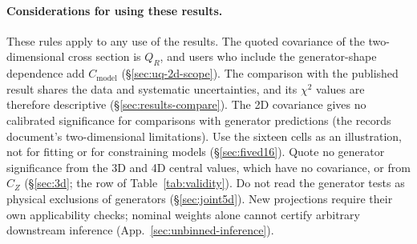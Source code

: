 \paragraph{Considerations for using these results.}\label{sec:usage}\label{sec:limitations-use} These rules apply to any use of the results. The quoted covariance of the two-dimensional cross section is $Q_R$, and users who include the generator-shape dependence add $C_{\mathrm{model}}$ (\S\ref{sec:uq-2d-scope}). The comparison with the published result shares the data and systematic uncertainties, and its $\chi^{2}$ values are therefore descriptive (\S\ref{sec:results-compare}). The 2D covariance gives no calibrated significance for comparisons with generator predictions (the records document's two-dimensional limitations). Use the sixteen cells as an illustration, not for fitting or for constraining models (\S\ref{sec:fived16}). Quote no generator significance from the 3D and 4D central values, which have no covariance, or from $C_Z$ (\S\ref{sec:3d}; the \resFiveAxis{} row of Table~\ref{tab:validity}). Do not read the generator tests as physical exclusions of generators (\S\ref{sec:joint5d}). New projections require their own applicability checks; nominal weights alone cannot certify arbitrary downstream inference (App.~\ref{sec:unbinned-inference}).
